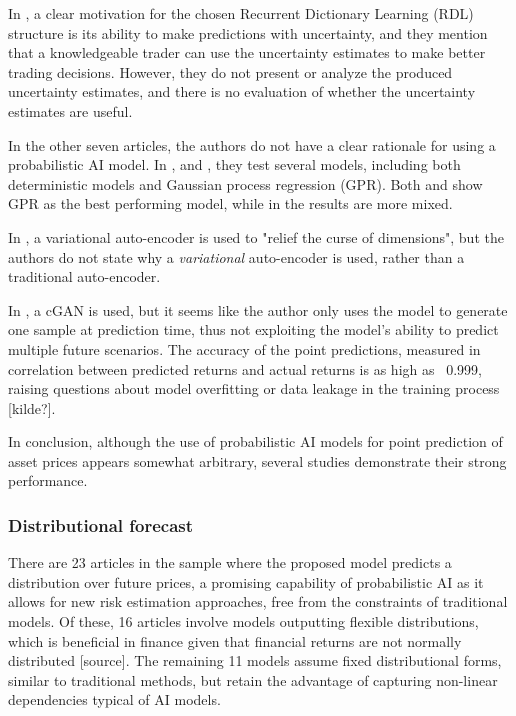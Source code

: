 In \textcite{Sharma2021}, a clear motivation for the chosen Recurrent Dictionary Learning (RDL) structure is its ability to make predictions with uncertainty, and they mention that a knowledgeable trader can use the uncertainty estimates to make better trading decisions. However, they do not present or analyze the produced uncertainty estimates, and there is no evaluation of whether the uncertainty estimates are useful.

In the other seven articles, the authors do not have a clear rationale for using a probabilistic AI model. In \textcite{Zmuk2020gpr}, \textcite{Park2014gpr} and \textcite{Papaioannou2022gpr}, they test several models, including both deterministic models and Gaussian process regression (GPR). Both \textcite{Park2014gpr} and \textcite{Papaioannou2022gpr} show GPR as the best performing model, while in \textcite{Zmuk2020gpr} the results are more mixed.

In \textcite{li2020multivariate}, a variational auto-encoder is used to "relief the curse of dimensions", but the authors do not state why a \textit{variational} auto-encoder is used, rather than a traditional auto-encoder.

In \textcite{salama2024gan}, a cGAN is used, but it seems like the author only uses the model to generate one sample at prediction time, thus not exploiting the model's ability to predict multiple future scenarios. The accuracy of the point predictions, measured in correlation between predicted returns and actual returns is as high as ~0.999, raising questions about model overfitting or data leakage in the training process [kilde?].

In conclusion, although the use of probabilistic AI models for point prediction of asset prices appears somewhat arbitrary, several studies demonstrate their strong performance.

\subsubsection{Distributional forecast}
There are 23 articles in the sample where the proposed model predicts a distribution over future prices, a promising capability of probabilistic AI as it allows for new risk estimation approaches, free from the constraints of traditional models. Of these, 16 articles involve models outputting flexible distributions, which is beneficial in finance given that financial returns are not normally distributed [source]. The remaining 11 models assume fixed distributional forms, similar to traditional methods, but retain the advantage of capturing non-linear dependencies typical of AI models.

